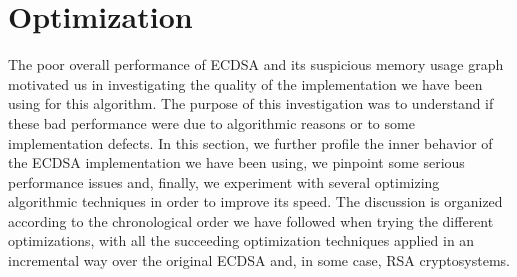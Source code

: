 \documentclass[authoryear]{elsarticle}
\begin{document}
\section{Optimization}
The poor overall performance of ECDSA and its suspicious memory usage graph motivated us in investigating the quality of the implementation we have been using for this algorithm. The purpose of this investigation was to understand if these bad performance were due to algorithmic reasons or to some implementation defects. In this section, we further profile the inner behavior of the ECDSA implementation we have been using, we pinpoint some serious performance issues and, finally, we experiment with several optimizing algorithmic techniques in order to improve its speed. The discussion is organized according to the chronological order we have followed when trying the different optimizations, with all the succeeding optimization techniques applied in an incremental way over the original ECDSA and, in some case, RSA cryptosystems.


%


%




\end{document}
